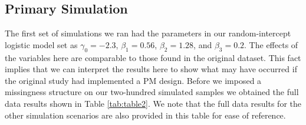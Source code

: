 \documentclass{svjour3}                     %
\begin{document}
\subsection{Primary Simulation}
\label{sec:3.1}
The first set of simulations we ran had the parameters in our random-intercept logistic model set as $\gamma_0 = -2.3$, $\beta_1 = 0.56$, $\beta_2 = 1.28$, and $\beta_3 = 0.2$. The effects of the variables here are comparable to those found in the original dataset. This fact implies that we can interpret the results here to show what may have occurred if the original study had implemented a PM design. Before we imposed a missingness structure on our two-hundred simulated samples we obtained the full data results shown in Table \ref{tab:table2}. We note that the full data results for the other simulation scenarios are also provided in this table for ease of reference.
\end{document}
